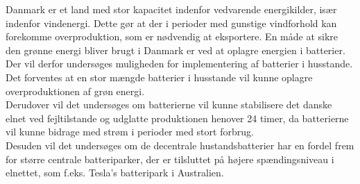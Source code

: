
Danmark er et land med stor kapacitet indenfor vedvarende energikilder, især indenfor vindenergi. Dette gør at der i perioder med gunstige vindforhold kan forekomme overproduktion, som er nødvendig at eksportere. En måde at sikre den grønne energi bliver brugt i Danmark er ved at oplagre energien i batterier. \\
Der vil derfor undersøges muligheden for implementering af batterier i husstande. Det forventes at en stor mængde batterier i husstande vil kunne oplagre overproduktionen af grøn energi. \\


Derudover vil det undersøges om batterierne vil kunne stabilisere det danske elnet ved fejltilstande og udglatte produktionen henover 24 timer, da batterierne vil kunne bidrage med strøm i perioder med stort forbrug. \\
Desuden vil det undersøges om de decentrale hustandsbatterier har en fordel frem for større centrale batteriparker, der er tilsluttet på højere spændingsniveau i elnettet, som f.eks. Tesla’s batteripark i Australien.
